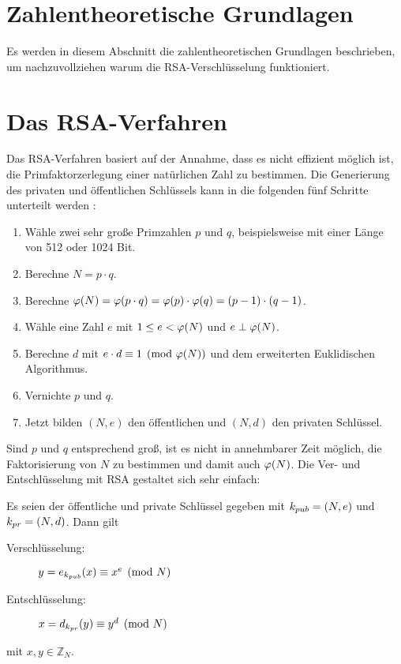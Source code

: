 \section{Zahlentheoretische Grundlagen}
Es werden in diesem Abschnitt die zahlentheoretischen Grundlagen beschrieben,
um nachzuvollziehen warum die RSA-Verschlüsselung funktioniert.







\section{Das RSA-Verfahren}
Das RSA-Verfahren basiert auf der Annahme, dass es nicht effizient
möglich ist, die Primfaktorzerlegung einer natürlichen Zahl zu bestimmen.
Die Generierung des privaten und öffentlichen Schlüssels kann in die
folgenden fünf Schritte unterteilt werden \parencite[176]{BOOK:crypto}:
\newpage

\begin{definition}\mbox{}
  \begin{enumerate}
    \item Wähle zwei sehr große Primzahlen $p$ und $q$, beispielsweise mit einer
          Länge von 512 oder 1024 Bit.
    \item Berechne $N = p \cdot q$.
    \item Berechne $\varphi(N) = \varphi(p \cdot q) = \varphi(p) \cdot \varphi(q) = (p-1) \cdot (q-1)$.
    \item Wähle eine Zahl $e$ mit $1 \leq e < \varphi(N)$ und $e \perp \varphi(N)$.
    \item Berechne $d$ mit $e \cdot d \equiv 1 \pmod{\varphi(N)}$ und dem erweiterten
          Euklidischen Algorithmus.
    \item Vernichte $p$ und $q$.
    \item Jetzt bilden $(N,e)$ den öffentlichen und $(N,d)$ den privaten Schlüssel.
  \end{enumerate}
\end{definition}

\noindent
Sind $p$ und $q$ entsprechend groß, ist es nicht in annehmbarer Zeit möglich, die Faktorisierung
von $N$ zu bestimmen und damit auch $\varphi(N)$. Die Ver- und Entschlüsselung mit RSA
gestaltet sich sehr einfach:

\begin{definition}
  Es seien der öffentliche und private Schlüssel gegeben mit
  $k_{pub} = (N,e)$ und $k_{pr} = (N,d)$. Dann gilt
  \begin{description}
    \item[Verschlüsselung:] $y = e_{k_{pub}}(x) \equiv x^e \pmod{N}$
    \item[Entschlüsselung:] $x = d_{k_{pr}}(y) \equiv y^d \pmod{N}$
  \end{description}
  mit $x,y \in \mathbb{Z}_N$.
\end{definition}

